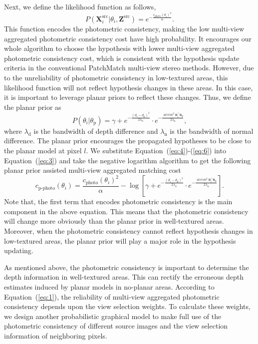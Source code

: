 \documentclass[letterpaper]{article} %
\begin{document}
Next, we define the likelihood function as follows,
\begin{equation}\label{eq:5}
P(\boldsymbol{X}_{i}^{\text{src}}|\theta_{i},\boldsymbol{Z}^{\text{src}})=e^{-\frac{c_{\text{photo}}(\theta_{i})^2}{\alpha}}.
\end{equation}
This function encodes the photometric consistency, making the low multi-view aggregated photometric consistency cost have high probability. It encourages our whole algorithm to choose the hypothesis with lower multi-view aggregated photometric consistency cost, which is consistent with the hypothesis update criteria in the conventional PatchMatch multi-view stereo methods. However, due to the unreliability of photometric consistency in low-textured areas, this likelihood function will not reflect hypothesis changes in these areas. In this case, it is important to leverage planar priors to reflect these changes. Thus, we define the planar prior as
\begin{equation}\label{eq:6}
P(\theta_{i}|\theta_{\text{p}})=\gamma+e^{-\frac{(d_{i}-d_{\text{p}})^2}{2\lambda_\text{d}}}\cdot e^{-\frac{{\arccos^2}\boldsymbol{n}_{i}^{\top}\boldsymbol{n}_{\text{p}}}{2\lambda_{\text{n}}}},
\end{equation}
where $\lambda_\text{d}$ is the bandwidth of depth difference and $\lambda_\text{n}$ is the bandwidth of normal difference. The planar prior encourages the propagated hypotheses to be close to the planar model at pixel $l$. We substitute Equation~(\ref{eq:4})-(\ref{eq:6}) into Equation~(\ref{eq:3}) and take the negative logarithm algorithm to get the following planar prior assisted multi-view aggregated matching cost
\begin{equation}\label{eq:7}
c_\text{p-photo}(\theta_{i})=\frac{c_\text{photo}(\theta_{i})^2}{\alpha}-\log[\gamma+e^{-\frac{(d_{i}-d_{\text{p}})^2}{2\lambda_\text{d}}}\cdot e^{-\frac{{\arccos^2}\boldsymbol{n}_{i}^{\top}\boldsymbol{n}_{\text{p}}}{2\lambda_{\text{n}}}}].
\end{equation}
Note that, the first term that encodes photometric consistency is the main component in the above equation. This means that the photometric consistency will change more obviously than the planar prior in well-textured areas. Moreover, when the photometric consistency cannot reflect hypothesis changes in low-textured areas, the planar prior will play a major role in the hypothesis updating.

As mentioned above, the photometric consistency is important to determine the depth information in well-textured areas. This can rectify the erroneous depth estimates induced by planar models in no-planar areas. According to Equation~(\ref{eq:1}), the reliability of multi-view aggregated photometric consistency depends upon the view selection weights. To calculate these weights, we design another probabilistic graphical model to make full use of the photometric consistency of different source images and the view selection information of neighboring pixels.
\end{document}
